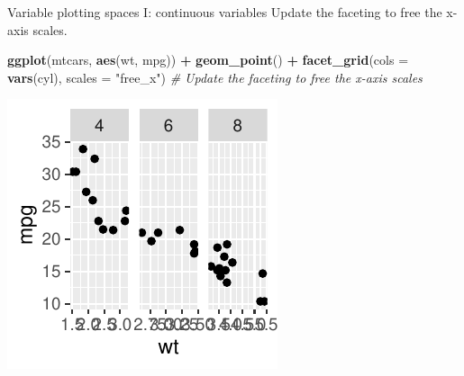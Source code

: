 \documentclass[
  ignorenonframetext,
]{beamer}
\newenvironment{Shaded}{\begin{snugshade}}{\end{snugshade}}
\newcommand{\AttributeTok}[1]{\textcolor[rgb]{0.13,0.29,0.53}{#1}}
\newcommand{\CommentTok}[1]{\textcolor[rgb]{0.56,0.35,0.01}{\textit{#1}}}
\newcommand{\FunctionTok}[1]{\textcolor[rgb]{0.13,0.29,0.53}{\textbf{#1}}}
\newcommand{\NormalTok}[1]{#1}
\newcommand{\SpecialCharTok}[1]{\textcolor[rgb]{0.81,0.36,0.00}{\textbf{#1}}}
\newcommand{\StringTok}[1]{\textcolor[rgb]{0.31,0.60,0.02}{#1}}
\begin{document}
\begin{frame}[fragile]{Variable plotting spaces I: continuous variables}
\label{variable-plotting-spaces-i-continuous-variables-5}
Update the faceting to free the x-axis scales.


\begin{Shaded}
\begin{Highlighting}[]
\FunctionTok{ggplot}\NormalTok{(mtcars, }\FunctionTok{aes}\NormalTok{(wt, mpg)) }\SpecialCharTok{+} \FunctionTok{geom\_point}\NormalTok{() }\SpecialCharTok{+} \FunctionTok{facet\_grid}\NormalTok{(}\AttributeTok{cols =} \FunctionTok{vars}\NormalTok{(cyl),}
    \AttributeTok{scales =} \StringTok{"free\_x"}\NormalTok{)  }\CommentTok{\# Update the faceting to free the x{-}axis scales}
\end{Highlighting}
\end{Shaded}

\begin{center}\includegraphics[width=0.5\linewidth]{Figs/unnamed-chunk-89-1} \end{center}
\end{frame}
\end{document}
